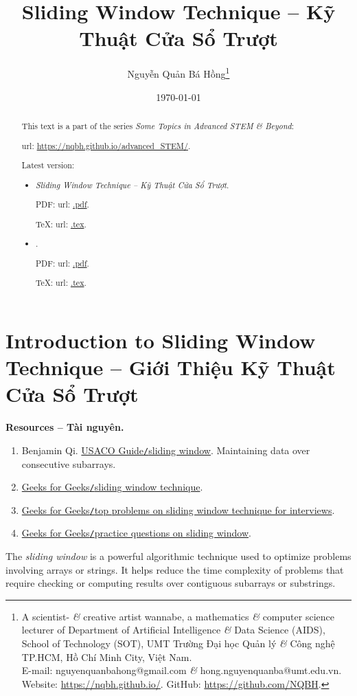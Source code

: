 \documentclass{article}
\title{Sliding Window Technique -- Kỹ Thuật Cửa Sổ Trượt}
\author{Nguyễn Quản Bá Hồng\footnote{A scientist- {\it\&} creative artist wannabe, a mathematics {\it\&} computer science lecturer of Department of Artificial Intelligence {\it\&} Data Science (AIDS), School of Technology (SOT), UMT Trường Đại học Quản lý {\it\&} Công nghệ TP.HCM, Hồ Chí Minh City, Việt Nam.\\E-mail: {\sf nguyenquanbahong@gmail.com} {\it\&} {\sf hong.nguyenquanba@umt.edu.vn}. Website: \url{https://nqbh.github.io/}. GitHub: \url{https://github.com/NQBH}.}}
\date{\today}
\begin{document}
\maketitle
\begin{abstract}
    This text is a part of the series {\it Some Topics in Advanced STEM \& Beyond}:

    {\sc url}: \url{https://nqbh.github.io/advanced_STEM/}.

    Latest version:
    \begin{itemize}
        \item {\it Sliding Window Technique -- Kỹ Thuật Cửa Sổ Trượt}.

        PDF: {\sc url}: \url{.pdf}.

        \TeX: {\sc url}: \url{.tex}.
        \item {\it }.

        PDF: {\sc url}: \url{.pdf}.

        \TeX: {\sc url}: \url{.tex}.
    \end{itemize}
\end{abstract}
\tableofcontents


\section{Introduction to Sliding Window Technique -- Giới Thiệu Kỹ Thuật Cửa Sổ Trượt}
\textbf{\textsf{Resources -- Tài nguyên.}}
\begin{enumerate}
    \item {\sc Benjamin Qi}. \href{https://usaco.guide/gold/sliding-window?lang=cpp}{USACO Guide{\tt/}sliding window}. Maintaining data over consecutive subarrays.

    \item \href{https://www.geeksforgeeks.org/dsa/window-sliding-technique/}{Geeks for Geeks{\tt/}sliding window technique}.

    \item \href{https://www.geeksforgeeks.org/dsa/top-problems-on-sliding-window-technique-for-interviews/}{Geeks for Geeks{\tt/}top problems on sliding window technique for interviews}.

    \item \href{https://www.geeksforgeeks.org/explore?page=2&category=sliding-window&sortBy=submissions}{Geeks for Geeks{\tt/}practice questions on sliding window}.
\end{enumerate}
The {\it sliding window} is a powerful algorithmic technique used to optimize problems involving arrays or strings. It helps reduce the time complexity of problems that require checking or computing results over contiguous subarrays or substrings.
\end{document}
